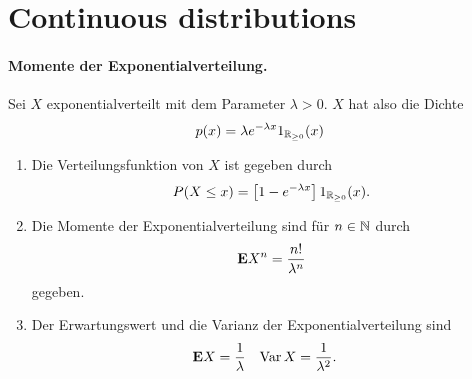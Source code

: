 \section{Continuous distributions}

\paragraph{Momente der Exponentialverteilung.} 
Sei $X$ exponentialverteilt mit dem Parameter $\lambda>0$. $X$ hat also die Dichte
\begin{equation*}
    p(x) = \lambda e^{-\lambda x } 1_{\mathbb R_{\geq 0}}(x)
\end{equation*}
\begin{enumerate}
    \item Die Verteilungsfunktion von $X$ ist gegeben durch
        \begin{equation*}
            P( X \leq x) = \left[ 1 - e^{-\lambda x} \right] 1_{\mathbb R_{\geq 0}}(x).
        \end{equation*}
    \item Die Momente der Exponentialverteilung sind für $n\in\mathbb N$ durch
        \begin{equation*}
            \mathbf{E} X^n = \frac{n!}{\lambda^{n}}
        \end{equation*}
        gegeben. 
    \item Der Erwartungswert und die Varianz der Exponentialverteilung sind
        \begin{align*}
            \mathbf{E} X    & = \frac{1}{\lambda} & 
            \operatorname{Var} X  & = \frac{1}{\lambda^2}.
        \end{align*}
\end{enumerate}
